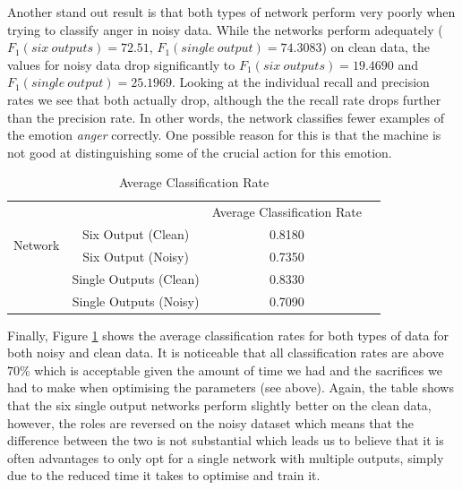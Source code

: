 \documentclass[10pt,a4paper]{article}
\begin{document}
Another stand out result is that both types of network perform very poorly when trying to classify anger in noisy data. While the networks perform adequately ($F_1(six~outputs) = 72.51$, $F_1(single~output) = 74.3083$) on clean data, the values for noisy data drop significantly to $F_1(six~outputs) = 19.4690$ and $F_1(single~output) = 25.1969$. Looking at the individual recall and precision rates we see that both actually drop, although the the recall rate drops further than the precision rate. In other words, the network classifies fewer examples of the emotion \emph{anger} correctly. One possible reason for this is that the machine is not good at distinguishing some of the crucial action for this emotion.


\begin{table}[!ht]
\centering
\begin{tabular}{|l|c|c|c|}
	\cline{3-3}
	\multicolumn{2}{c|}{} & Average Classification Rate \\ \cline{1-3}
	\multirow{2}{*}{Network}& Six Output (Clean) & 0.8180  \\ \cline{2-3}  
	& Six Output (Noisy) & 0.7350  \\ \cline{2-3} 
		& Single Outputs (Clean) & 0.8330 \\ \cline{2-3} 
	& Single Outputs (Noisy) & 0.7090 \\ \hline

\end{tabular}
\caption{Average Classification Rate}
\label{tab:avgClassificationRate}
\end{table}

Finally, Figure \ref{tab:avgClassificationRate} shows the average classification rates for both types of data for both noisy and clean data. It is noticeable that all classification rates are above $70\%$ which is acceptable given the amount of time we had and the sacrifices we had to make when optimising the parameters (see above). Again, the table shows that the six single output networks perform slightly better on the clean data, however, the roles are reversed on the noisy dataset which means that the difference between the two is not substantial which leads us to believe that it is often advantages to only opt for a single network with multiple outputs, simply due to the reduced time it takes to optimise and train it.
\end{document}
